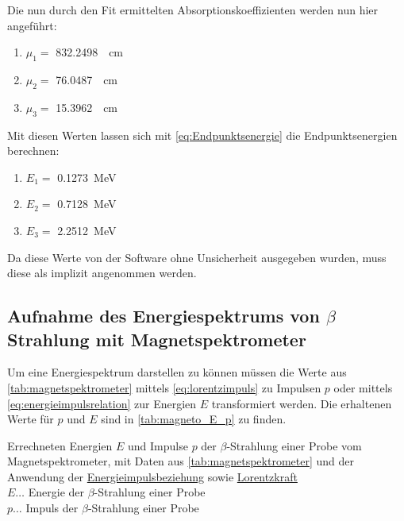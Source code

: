 \documentclass[12pt,english,ngerman]{scrartcl}
\begin{document}
Die nun durch den Fit ermittelten Absorptionskoeffizienten werden nun hier
angeführt:

\begin{enumerate}
	\item $\mu_1 = $ \SI{832.2498}{\per\cm}
	\item $\mu_2 = $ \SI{76.0487}{\per\cm}
	\item $\mu_3 = $ \SI{15.3962}{\per\cm}
\end{enumerate}

Mit diesen Werten lassen sich mit \autoref{eq:Endpunktsenergie} die
Endpunktsenergien berechnen:

\begin{enumerate}
	\item $E_1 = $ \SI{0.1273}{\mega\electronvolt}
	\item $E_2 = $ \SI{0.7128}{\mega\electronvolt}
	\item $E_3 = $ \SI{2.2512}{\mega\electronvolt}
\end{enumerate}

Da diese Werte von der Software ohne Unsicherheit ausgegeben wurden, muss diese
als implizit angenommen werden.

\subsection{Aufnahme des Energiespektrums von \texorpdfstring{$\beta$}{beta}
	Strahlung mit Magnetspektrometer}

Um eine Energiespektrum darstellen zu können müssen die Werte aus
\autoref{tab:magnetspektrometer} mittels \autoref{eq:lorentzimpuls} zu Impulsen
$p$ oder mittels \autoref{eq:energieimpulsrelation} zur Energien $E$
transformiert werden. Die erhaltenen Werte für $p$ und $E$ sind in
\autoref{tab:magneto_E_p} zu finden.

\begin{table}[H]
	\caption[Energie- und Impulswerte der $\beta$-Strahlung einer  Probe]{Errechneten Energien $E$ und Impulse $p$ der $\beta$-Strahlung einer
		 Probe vom Magnetspektrometer, mit Daten aus
		\autoref{tab:magnetspektrometer} und der Anwendung der
		\hyperref[eq:energieimpulsrelation]{Energieimpulsbeziehung} sowie
		\hyperref[eq:lorentzimpuls]{Lorentzkraft} \\
		$E \dots$ Energie der $\beta$-Strahlung einer  Probe\\
		$p \dots$ Impuls der $\beta$-Strahlung einer  Probe\\
	}\label{tab:magneto_E_p}
	\centering
	
\end{table}
\end{document}
